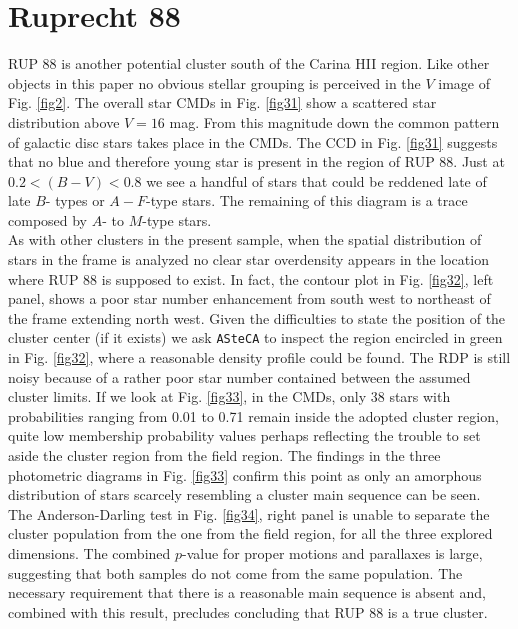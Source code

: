 \documentclass[draft]{aa}
\begin{document}
\section{Ruprecht 88}

RUP 88 is another potential cluster south of the Carina HII region. Like
other objects in this paper no obvious stellar grouping is perceived in the $V$
image of Fig. \ref{fig2}. The overall star CMDs in Fig. \ref{fig31} show a
scattered star distribution above $V = 16$ mag. From this magnitude down the
common pattern of galactic disc stars takes place in the CMDs. The CCD in Fig.
\ref{fig31} suggests that no blue and therefore young star is present in the
region of RUP 88. Just at $0.2 < (B-V) < 0.8$ we see a handful of stars that
could be reddened late of late $B$- types or $A-F$-type stars. The remaining of
this diagram is a trace composed by $A$- to $M$-type stars.\\

As with other clusters in the present sample, when the spatial distribution
of stars in the frame is analyzed no clear star overdensity
appears in the location where RUP 88 is supposed to exist. In fact, the
contour plot in Fig. \ref{fig32}, left panel, shows a poor star number
enhancement from south west to northeast of the frame extending north west.
Given the difficulties to state the position of the cluster center (if it
exists) we ask \texttt{ASteCA} to inspect the region encircled in green in Fig.
\ref{fig32}, where a reasonable density profile could be found. The
RDP is still noisy because of a rather poor star number contained between the
assumed cluster limits. If we look at Fig. \ref{fig33}, in the CMDs, only 38
stars with probabilities ranging from 0.01 to 0.71 remain inside the adopted
cluster region, quite low membership probability values perhaps reflecting the
trouble to set aside the cluster region from the field region. The findings in
the three photometric diagrams in Fig. \ref{fig33} confirm this point as only an
amorphous distribution of stars scarcely resembling a cluster main sequence can
be seen.\\

The Anderson-Darling test in Fig. \ref{fig34}, right panel is unable to
separate the cluster population from the one from the field region, for all the
three explored dimensions. The combined $p$-value for proper
motions and parallaxes is large, suggesting that both samples do not come from
the same population. The necessary requirement that there is a reasonable main
sequence is absent and, combined with this result, precludes
concluding that RUP 88 is a true cluster.
\end{document}
